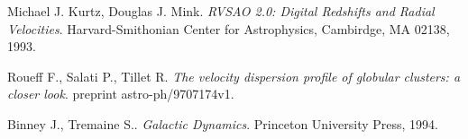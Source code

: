 \documentclass[a4paper, 11pt, oneside]{Thesis}  %
\begin{document}
\mainmatter	  %
\pagestyle{fancy}  %




 


\begin{thebibliography}{9}
Michael J. Kurtz, Douglas J. Mink. 
\textit{RVSAO 2.0: Digital Redshifts and Radial Velocities}. 
Harvard-Smithonian Center for Astrophysics, Cambirdge, MA 02138, 1993.

Roueff F., Salati P., Tillet R. 
\textit{The velocity dispersion profile of globular clusters: a closer look}. 
preprint astro-ph/9707174v1.

Binney J., Tremaine S.. 
\textit{Galactic Dynamics}. 
Princeton University Press, 1994.


\end{thebibliography}

\label{Bibliography}
\end{document}

